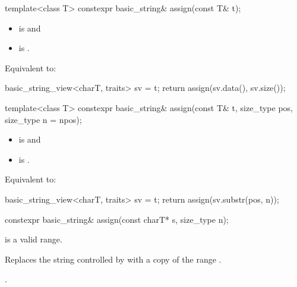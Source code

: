 %
\begin{itemdecl}
template<class T>
  constexpr basic_string& assign(const T& t);
\end{itemdecl}

\begin{itemdescr}
\pnum
\constraints
\begin{itemize}
\item
{} is
 and
\item
{} is
.
\end{itemize}

\pnum
\effects
Equivalent to:
\begin{codeblock}
basic_string_view<charT, traits> sv = t;
return assign(sv.data(), sv.size());
\end{codeblock}
\end{itemdescr}

%
\begin{itemdecl}
template<class T>
  constexpr basic_string& assign(const T& t, size_type pos, size_type n = npos);
\end{itemdecl}

\begin{itemdescr}
\pnum
\constraints
\begin{itemize}
\item
{} is
 and
\item
{} is
.
\end{itemize}

\pnum
\effects
Equivalent to:
\begin{codeblock}
basic_string_view<charT, traits> sv = t;
return assign(sv.substr(pos, n));
\end{codeblock}
\end{itemdescr}

%
\begin{itemdecl}
constexpr basic_string& assign(const charT* s, size_type n);
\end{itemdecl}

\begin{itemdescr}
\pnum
\expects
{} is a valid range.

\pnum
\effects
Replaces the string controlled by  with
a copy of the range .

\pnum
\returns
{}.
\end{itemdescr}

